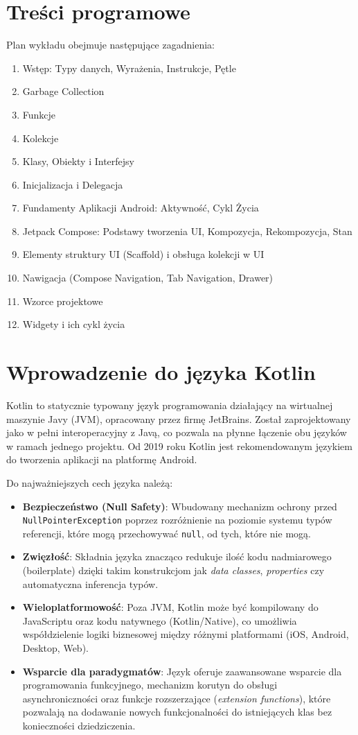 \section{Treści programowe}
Plan wykładu obejmuje następujące zagadnienia:
\begin{enumerate}
    \item Wstęp: Typy danych, Wyrażenia, Instrukcje, Pętle
    \item Garbage Collection
    \item Funkcje
    \item Kolekcje
    \item Klasy, Obiekty i Interfejsy
    \item Inicjalizacja i Delegacja
    \item Fundamenty Aplikacji Android: Aktywność, Cykl Życia
    \item Jetpack Compose: Podstawy tworzenia UI, Kompozycja, Rekompozycja, Stan
    \item Elementy struktury UI (Scaffold) i obsługa kolekcji w UI
    \item Nawigacja (Compose Navigation, Tab Navigation, Drawer)
    \item Wzorce projektowe
    \item Widgety i ich cykl życia
\end{enumerate}

\section{Wprowadzenie do języka Kotlin}
Kotlin to statycznie typowany język programowania działający na wirtualnej maszynie Javy (JVM), opracowany przez firmę JetBrains. Został zaprojektowany jako w pełni interoperacyjny z Javą, co pozwala na płynne łączenie obu języków w ramach jednego projektu. Od 2019 roku Kotlin jest rekomendowanym językiem do tworzenia aplikacji na platformę Android.

Do najważniejszych cech języka należą:
\begin{itemize}
    \item \textbf{Bezpieczeństwo (Null Safety)}: Wbudowany mechanizm ochrony przed \texttt{Null\-Pointer\-Exception} poprzez rozróżnienie na poziomie systemu typów referencji, które mogą przechowywać \texttt{null}, od tych, które nie mogą.
    \item \textbf{Zwięzłość}: Składnia języka znacząco redukuje ilość kodu nadmiarowego (boilerplate) dzięki takim konstrukcjom jak \textit{data classes}, \textit{properties} czy automatyczna inferencja typów.
    \item \textbf{Wieloplatformowość}: Poza JVM, Kotlin może być kompilowany do JavaScriptu oraz kodu natywnego (Kotlin/Native), co umożliwia współdzielenie logiki biznesowej między różnymi platformami (iOS, Android, Desktop, Web).
    \item \textbf{Wsparcie dla paradygmatów}: Język oferuje zaawansowane wsparcie dla programowania funkcyjnego, mechanizm korutyn do obsługi asynchroniczności oraz funkcje rozszerzające (\textit{extension functions}), które pozwalają na dodawanie nowych funkcjonalności do istniejących klas bez konieczności dziedziczenia.
\end{itemize}

